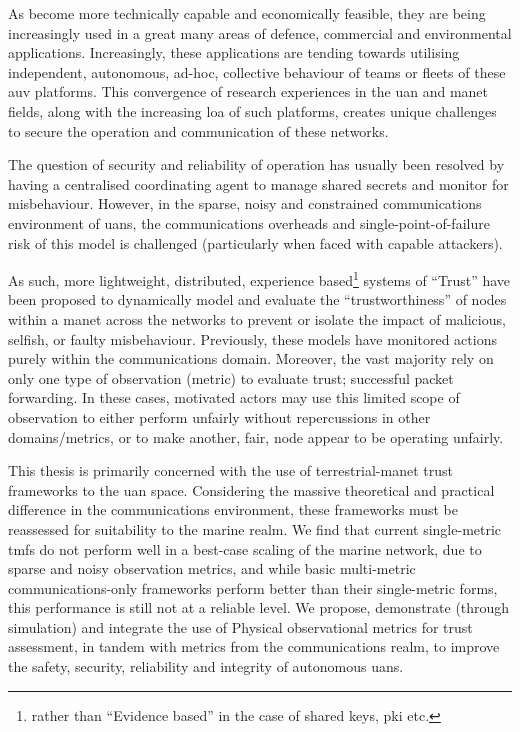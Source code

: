 As  become more technically capable and economically feasible, they are being increasingly used in a great many areas of defence, commercial and environmental applications. 
Increasingly, these applications are tending towards utilising independent, autonomous, ad-hoc, collective behaviour of teams or fleets of these \gls{auv} platforms.
This convergence of research experiences in the \acrfull{uan} and \gls{manet} fields, along with the increasing \gls{loa} of such platforms, creates unique challenges to secure the operation and communication of these networks.

The question of security and reliability of operation has usually been resolved by having a centralised coordinating agent to manage shared secrets and monitor for misbehaviour.
However, in the sparse, noisy and constrained communications environment of \glspl{uan}, the communications overheads and single-point-of-failure risk of this model is challenged (particularly when faced with capable attackers).

As such, more lightweight, distributed, experience based\footnote{rather than ``Evidence based'' in the case of shared keys, \gls{pki} etc.} systems of ``Trust'' have been proposed to dynamically model and evaluate the ``trustworthiness'' of nodes within a \gls{manet} across the networks to prevent or isolate the impact of malicious, selfish, or faulty misbehaviour. 
Previously, these models have monitored actions purely within the communications domain. 
Moreover, the vast majority rely on only one type of observation (metric) to evaluate trust; successful packet forwarding.
In these cases, motivated actors may use this limited scope of observation to either perform unfairly without repercussions in other domains/metrics, or to make another, fair, node appear to be operating unfairly.

This thesis is primarily concerned with the use of terrestrial-\gls{manet} trust frameworks to the \gls{uan} space. 
Considering the massive theoretical and practical difference in the communications environment, these frameworks must be reassessed for suitability to the marine realm. 
We find that current single-metric \glspl{tmf} do not perform well in a best-case scaling of the marine network, due to sparse and noisy observation metrics, and while basic multi-metric communications-only frameworks perform better than their single-metric forms, this performance is still not at a reliable level. 
We propose, demonstrate (through simulation) and integrate the use of Physical observational metrics for trust assessment, in tandem with metrics from the communications realm, to improve the safety, security, reliability and integrity of autonomous \glspl{uan}.

